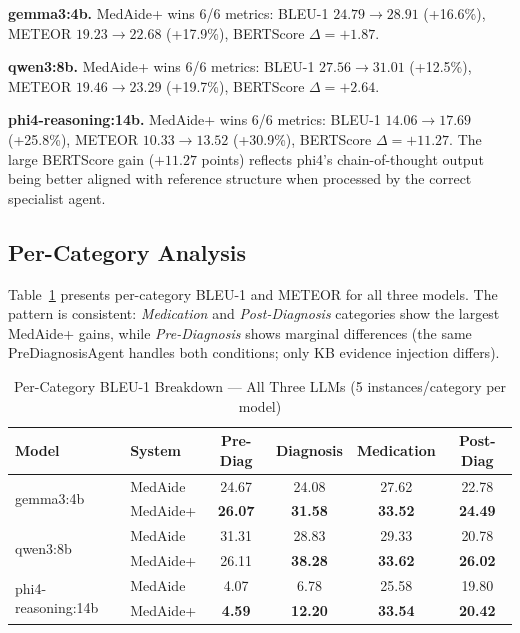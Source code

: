 \documentclass[conference]{IEEEtran}
\begin{document}
\noindent\textbf{gemma3:4b.} MedAide+ wins 6/6 metrics: BLEU-1 $24.79 \rightarrow 28.91$ (+16.6\%), METEOR $19.23 \rightarrow 22.68$ (+17.9\%), BERTScore $\Delta=+1.87$.

\noindent\textbf{qwen3:8b.} MedAide+ wins 6/6 metrics: BLEU-1 $27.56 \rightarrow 31.01$ (+12.5\%), METEOR $19.46 \rightarrow 23.29$ (+19.7\%), BERTScore $\Delta=+2.64$.

\noindent\textbf{phi4-reasoning:14b.} MedAide+ wins 6/6 metrics: BLEU-1 $14.06 \rightarrow 17.69$ (+25.8\%), METEOR $10.33 \rightarrow 13.52$ (+30.9\%), BERTScore $\Delta=+11.27$. The large BERTScore gain ($+11.27$ points) reflects phi4's chain-of-thought output being better aligned with reference structure when processed by the correct specialist agent.

\subsection{Per-Category Analysis}
\label{sec:percategory}

Table~\ref{tab:percategory} presents per-category BLEU-1 and METEOR for all three
models. The pattern is consistent: \emph{Medication} and \emph{Post-Diagnosis}
categories show the largest MedAide+ gains, while \emph{Pre-Diagnosis} shows marginal
differences (the same PreDiagnosisAgent handles both conditions; only KB evidence
injection differs).

\begin{table}[t]
\centering
\caption{Per-Category BLEU-1 Breakdown — All Three LLMs (5 instances/category per model)}
\label{tab:percategory}
\setlength{\tabcolsep}{3pt}
\begin{tabular}{llcccc}
\toprule
\textbf{Model} & \textbf{System} & \textbf{Pre-Diag} & \textbf{Diagnosis} & \textbf{Medication} & \textbf{Post-Diag} \\
\midrule
\multirow{2}{*}{gemma3:4b}
  & MedAide  & 24.67 & 24.08 & 27.62 & 22.78 \\
  & MedAide+ & \textbf{26.07} & \textbf{31.58} & \textbf{33.52} & \textbf{24.49} \\
\midrule
\multirow{2}{*}{qwen3:8b}
  & MedAide  & 31.31 & 28.83 & 29.33 & 20.78 \\
  & MedAide+ & 26.11 & \textbf{38.28} & \textbf{33.62} & \textbf{26.02} \\
\midrule
\multirow{2}{*}{phi4-reasoning:14b}
  & MedAide  & 4.07 & 6.78 & 25.58 & 19.80 \\
  & MedAide+ & \textbf{4.59} & \textbf{12.20} & \textbf{33.54} & \textbf{20.42} \\
\bottomrule
\end{tabular}
\end{table}
\end{document}
